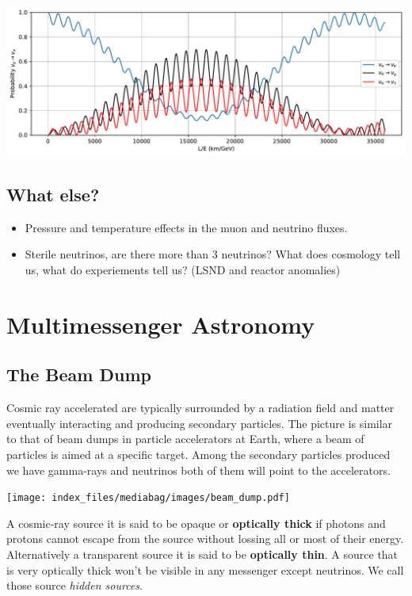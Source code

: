 \documentclass[
  letterpaper,
  DIV=11,
  numbers=noendperiod]{scrreprt}
\begin{document}
\includegraphics{chap3_files/figure-pdf/cell-8-output-1.pdf}

\section{What else?}\label{what-else}

\begin{itemize}
\item
  Pressure and temperature effects in the muon and neutrino fluxes.
\item
  Sterile neutrinos, are there more than 3 neutrinos? What does
  cosmology tell us, what do experiements tell us? (LSND and reactor
  anomalies)
\end{itemize}


\chapter{Multimessenger Astronomy}\label{multimessenger-astronomy}

\section{The Beam Dump}\label{the-beam-dump}

Cosmic ray accelerated are typically surrounded by a radiation field and
matter eventually interacting and producing secondary particles. The
picture is similar to that of beam dumps in particle accelerators at
Earth, where a beam of particles is aimed at a specific target. Among
the secondary particles produced we have gamma-rays and neutrinos both
of them will point to the accelerators.

\texttt{[image: index\_files/mediabag/images/beam\_dump.pdf]}

A cosmic-ray source it is said to be opaque or \textbf{optically thick}
if photons and protons cannot escape from the source without lossing all
or most of their energy. Alternatively a transparent source it is said
to be \textbf{optically thin}. A source that is very optically thick
won't be visible in any messenger except neutrinos. We call those source
\emph{hidden sources}.
\end{document}
